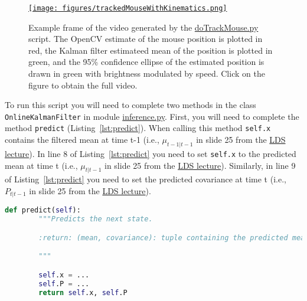 \documentclass[12pt]{article}
\begin{document}
\begin{figure}
	\begin{center}
		\href{https://www.gatsby.ucl.ac.uk/~rapela/neuroinformatics/2024/worksheets/linearDynamicalSystems/videos/FrameTop_2021-06-03T17-00-00_end001000.avi}{\texttt{[image: figures/trackedMouseWithKinematics.png]}}
		\label{fig:trackedMouseWithKinematics}

        \caption{Example frame of the video generated by the
        \href{https://github.com/joacorapela/neuroinformatics24/blob/master/worksheets/07_linearDynamicalSystems/code/scripts/doTrackMouse.py}{doTrackMouse.py}
        script. The OpenCV estimate of the mouse position is plotted in red,
        the Kalman filter estimateed mean of the position is plotted in green,
        and the 95\% confidence ellipse of the estimated position is drawn in
        green with brightness modulated by speed. Click on the figure to obtain
        the full video.}

	\end{center}
\end{figure}

To run this script you will need to complete two methods in the class
\texttt{OnlineKalmanFilter} in module
\href{https://github.com/joacorapela/neuroinformatics24/blob/master/worksheets/07_linearDynamicalSystems/code/src/inference.py}{inference.py}.
%
First, you will need to complete the method \texttt{predict}
(Listing~\ref{lst:predict}). When calling this method \texttt{self.x} contains
the filtered mean at time t-1 (i.e., $\mu_{t-1|t-1}$ in slide 25 from the
\href{https://github.com/joacorapela/neuroinformatics24/blob/master/lectures/07_linearDynamicalSystems/LDS_SWCNeuroinf2024.pdf}{LDS
lecture}). In line 8 of Listing~\ref{lst:predict} you need to set
\texttt{self.x} to the predicted mean at time t (i.e., $\mu_{t|t-1}$ in slide
25 from the
\href{https://github.com/joacorapela/neuroinformatics24/blob/master/lectures/07_linearDynamicalSystems/LDS_SWCNeuroinf2024.pdf}{LDS
lecture}). Similarly, in line 9 of Listing~\ref{lst:predict} you need to set
the predicted covariance at time t (i.e., $P_{t|t-1}$ in slide 25 from the
\href{https://github.com/joacorapela/neuroinformatics24/blob/master/lectures/07_linearDynamicalSystems/LDS_SWCNeuroinf2024.pdf}{LDS lecture}). 

\begin{lstlisting}[caption={method \texttt{predict} in class \texttt{OnlineKalmanFilter} in module \texttt{inference.py}},label={lst:predict},language=python]
    def predict(self):
        """Predicts the next state.

        :return: (mean, covariance): tuple containing the predicted mean and covariance matrix.

        """

        self.x = ...
        self.P = ...
        return self.x, self.P
\end{lstlisting}
\end{document}
